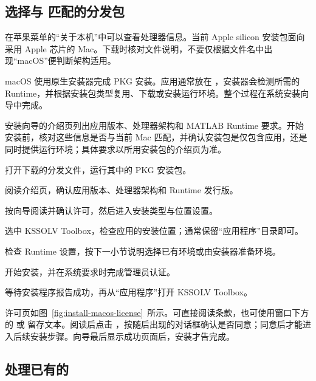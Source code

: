 \subsection{选择与  匹配的分发包}

在苹果菜单的“关于本机”中可以查看处理器信息。当前 Apple silicon 安装包面向采用 Apple 芯片的 Mac。下载时核对文件说明，不要仅根据文件名中出现“macOS”便判断架构适用。

macOS 使用原生安装器完成 PKG 安装。应用通常放在 ，安装器会检测所需的 Runtime，并根据安装包类型复用、下载或安装运行环境。整个过程在系统安装向导中完成。

安装向导的介绍页列出应用版本、处理器架构和 MATLAB\regmark{} Runtime 要求。开始安装前，核对这些信息是否与当前 Mac 匹配，并确认安装包是仅包含应用，还是同时提供运行环境；具体要求以所用安装包的介绍页为准。

\begin{steps}
\item 打开下载的分发文件，运行其中的 PKG 安装包。
\item 阅读介绍页，确认应用版本、处理器架构和 Runtime 发行版。
\item 按向导阅读并确认许可，然后进入安装类型与位置设置。
\item 选中 KSSOLV Toolbox，检查应用的安装位置；通常保留“应用程序”目录即可。
\item 检查 Runtime 设置，按下一小节说明选择已有环境或由安装器准备环境。
\item 开始安装，并在系统要求时完成管理员认证。
\item 等待安装程序报告成功，再从“应用程序”打开 KSSOLV Toolbox。
\end{steps}

许可页如图~\ref{fig:install-macos-license}~所示。可直接阅读条款，也可使用窗口下方的  或  留存文本。阅读后点击 ，按随后出现的对话框确认是否同意；同意后才能进入后续安装步骤。向导最后显示成功页面后，安装才告完成。



\subsection{处理已有的 }

